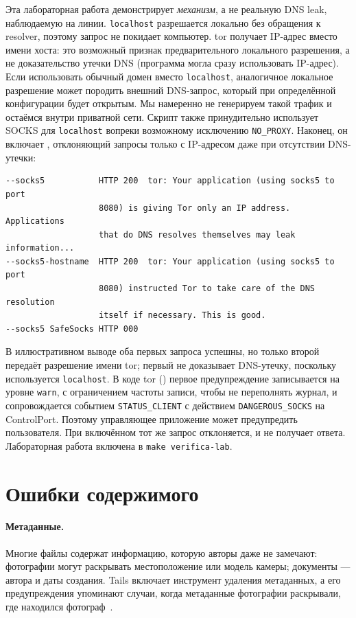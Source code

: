 Эта лабораторная работа демонстрирует \emph{механизм}, а не реальную DNS leak, наблюдаемую на линии. \texttt{localhost} разрешается локально без обращения к resolver, поэтому запрос не покидает компьютер. tor получает IP-адрес вместо имени хоста: это возможный признак предварительного локального разрешения, а не доказательство утечки DNS (программа могла сразу использовать IP-адрес). Если использовать обычный домен вместо \texttt{localhost}, аналогичное локальное разрешение может породить внешний DNS-запрос, который при определённой конфигурации будет открытым. Мы намеренно не генерируем такой трафик и остаёмся внутри приватной сети. Скрипт также принудительно использует SOCKS для \texttt{localhost} вопреки возможному исключению \texttt{NO\_PROXY}. Наконец, он включает , отклоняющий запросы только с IP-адресом даже при отсутствии DNS-утечки:
\begin{lstlisting}[numbers=none]
--socks5           HTTP 200  tor: Your application (using socks5 to port
                   8080) is giving Tor only an IP address. Applications
                   that do DNS resolves themselves may leak information...
--socks5-hostname  HTTP 200  tor: Your application (using socks5 to port
                   8080) instructed Tor to take care of the DNS resolution
                   itself if necessary. This is good.
--socks5 SafeSocks HTTP 000
\end{lstlisting}
В иллюстративном выводе оба первых запроса успешны, но только второй передаёт разрешение имени tor; первый не доказывает DNS-утечку, поскольку используется \texttt{localhost}. В коде tor () первое предупреждение записывается на уровне \texttt{warn}, с ограничением частоты записи, чтобы не переполнять журнал, и сопровождается событием \texttt{STATUS\_CLIENT} с действием \texttt{DANGEROUS\_SOCKS} на ControlPort. Поэтому управляющее приложение может предупредить пользователя. При включённом  тот же запрос отклоняется, и  не получает ответа. Лабораторная работа включена в \texttt{make verifica-lab}.

\section{Ошибки содержимого}\label{sec:opsec-contenuto}

\paragraph{Метаданные.} Многие файлы содержат информацию, которую авторы даже не замечают: фотографии могут раскрывать местоположение или модель камеры; документы — автора и даты создания. Tails включает инструмент удаления метаданных, а его предупреждения упоминают случаи, когда метаданные фотографии раскрывали, где находился фотограф~\cite{tailswarnings}.

